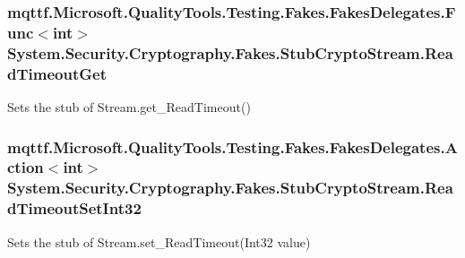 \hypertarget{class_system_1_1_security_1_1_cryptography_1_1_fakes_1_1_stub_crypto_stream_adb76fb58f0efe7472e1ea0c6a961616c}{
\subsubsection[{Read\-Timeout\-Get}]{\setlength{\rightskip}{0pt plus 5cm}mqttf.\-Microsoft.\-Quality\-Tools.\-Testing.\-Fakes.\-Fakes\-Delegates.\-Func$<$int$>$ System.\-Security.\-Cryptography.\-Fakes.\-Stub\-Crypto\-Stream.\-Read\-Timeout\-Get}}\label{class_system_1_1_security_1_1_cryptography_1_1_fakes_1_1_stub_crypto_stream_adb76fb58f0efe7472e1ea0c6a961616c}


Sets the stub of Stream.\-get\-\_\-\-Read\-Timeout()

\hypertarget{class_system_1_1_security_1_1_cryptography_1_1_fakes_1_1_stub_crypto_stream_a306841253bf5606215f5a7df95b39513}{
\subsubsection[{Read\-Timeout\-Set\-Int32}]{\setlength{\rightskip}{0pt plus 5cm}mqttf.\-Microsoft.\-Quality\-Tools.\-Testing.\-Fakes.\-Fakes\-Delegates.\-Action$<$int$>$ System.\-Security.\-Cryptography.\-Fakes.\-Stub\-Crypto\-Stream.\-Read\-Timeout\-Set\-Int32}}\label{class_system_1_1_security_1_1_cryptography_1_1_fakes_1_1_stub_crypto_stream_a306841253bf5606215f5a7df95b39513}


Sets the stub of Stream.\-set\-\_\-\-Read\-Timeout(\-Int32 value)

